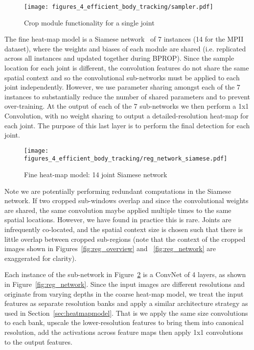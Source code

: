 \begin{figure}[ht]
\centering
\texttt{[image: figures\_4\_efficient\_body\_tracking/sampler.pdf]}
   \caption{Crop module functionality for a single joint}
\label{fig:sampler}
\end{figure}

The fine heat-map model is a Siamese network~\cite{bromley1993signature} of 7 instances (14 for the MPII dataset), where the weights and biases of each module are shared (i.e. replicated across all instances and updated together during BPROP). Since the sample location for each joint is different, the convolution features do not share the same spatial context and so the convolutional sub-networks must be applied to each joint independently. However, we use parameter sharing amongst each of the 7 instances to substantially reduce the number of shared parameters and to prevent over-training. At the output of each of the 7 sub-networks we then perform a 1x1 Convolution, with no weight sharing to output a detailed-resolution heat-map for each joint. The purpose of this last layer is to perform the final detection for each joint.

\begin{figure}[ht]
\centering
\texttt{[image: figures\_4\_efficient\_body\_tracking/reg\_network\_siamese.pdf]}
   \caption{Fine heat-map model: 14 joint Siamese network}
\label{fig:reg_network_siamese}
\end{figure}

Note we are potentially performing redundant computations in the Siamese network. If two cropped sub-windows overlap and since the convolutional weights are shared, the same convolution maybe applied multiple times to the same spatial locations. However, we have found in practice this is rare. Joints are infrequently co-located, and the spatial context size is chosen such that there is little overlap between cropped sub-regions (note that the context of the cropped images shown in Figures~\ref{fig:reg_overview} and ~\ref{fig:reg_network} are exaggerated for clarity).

Each instance of the sub-network in Figure~\ref{fig:reg_network_siamese} is a ConvNet of 4 layers, as shown in Figure~\ref{fig:reg_network}. Since the input images are different resolutions and originate from varying depths in the coarse heat-map model, we treat the input features as separate resolution banks and apply a similar architecture strategy as used in Section~\ref{sec:heatmapmodel}. That is we apply the same size convolutions to each bank, upscale the lower-resolution features to bring them into canonical resolution, add the activations across feature maps then apply 1x1 convolutions to the output features.

